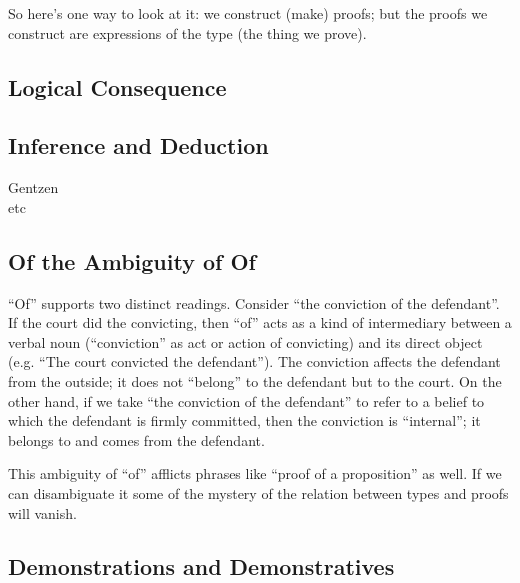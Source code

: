 So here's one way to look at it: we construct (make) proofs; but the
proofs we construct are expressions of the type (the thing we prove).

\subsection{Logical Consequence}
\label{subs:logconseq}

\cite{prawitz_logical_2005}

\cite{prawitz_meaning_2006}

\cite{prawitz_inference_2009}

\cite{prawitz_epistemic_2011}

\cite{prawitz_truth_epistemic}

\subsection{Inference and Deduction}
\label{sect:infdeduc}

\begin{description}
\item [Gentzen]
\item [etc]
\end{description}

\subsection{Of the Ambiguity of Of}
\label{subs:ofofof}

``Of'' supports two distinct readings.  Consider ``the conviction of
the defendant''.  If the court did the convicting, then ``of'' acts as
a kind of intermediary between a verbal noun (``conviction'' as act or
action of convicting) and its direct object (e.g. ``The court
convicted the defendant'').  The conviction affects the defendant from
the outside; it does not ``belong'' to the defendant but to the court.
On the other hand, if we take ``the conviction of the defendant'' to
refer to a belief to which the defendant is firmly committed, then the
conviction is ``internal''; it belongs to and comes from the
defendant.

This ambiguity of ``of'' afflicts phrases like ``proof of a
proposition'' as well.  If we can disambiguate it some of the mystery
of the relation between types and proofs will vanish.

\subsection{Demonstrations and Demonstratives}
\label{subs:}


